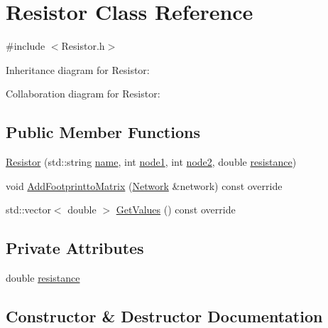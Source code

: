 \hypertarget{classResistor}{}\section{Resistor Class Reference}
\label{classResistor}


{\ttfamily \#include $<$Resistor.\+h$>$}



Inheritance diagram for Resistor\+:


Collaboration diagram for Resistor\+:
\subsection*{Public Member Functions}
\begin{DoxyCompactItemize}
\item 
\hyperlink{classResistor_a2b3a5d755e8f1d8de6febc51740945ab}{Resistor} (std\+::string \hyperlink{classComponent_a46343549452bda5ee9752f7a9bc15efb}{name}, int \hyperlink{classComponent_a7d8cd23c0aaff5c139b825e77c0b2051}{node1}, int \hyperlink{classComponent_af96df64e1eb5fac7dae7c674cac3d31e}{node2}, double \hyperlink{classResistor_ac940c96f396ad2ad276d03c60106ebe4}{resistance})
\item 
void \hyperlink{classResistor_a1e2d669a6b28b5b46457af5caae7462c}{Add\+Footprintto\+Matrix} (\hyperlink{classNetwork}{Network} \&network) const override
\item 
std\+::vector$<$ double $>$ \hyperlink{classResistor_ad4d08c34efa99287438aac338d7012d7}{Get\+Values} () const override
\end{DoxyCompactItemize}
\subsection*{Private Attributes}
\begin{DoxyCompactItemize}
\item 
double \hyperlink{classResistor_ac940c96f396ad2ad276d03c60106ebe4}{resistance}
\end{DoxyCompactItemize}


\subsection{Constructor \& Destructor Documentation}
\mbox{\label{classResistor_a2b3a5d755e8f1d8de6febc51740945ab}} 
